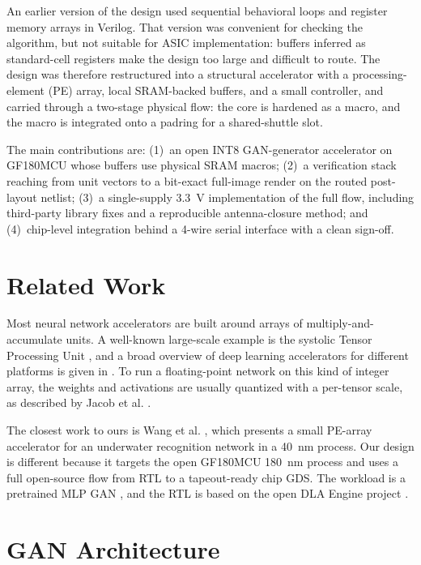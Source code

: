 \documentclass[conference,a4paper]{APSIPA2026}
\begin{document}
An earlier version of the design used sequential behavioral loops and register memory arrays in Verilog. That version was convenient for checking the algorithm, but not suitable for ASIC implementation: buffers inferred as standard-cell registers make the design too large and difficult to route. The design was therefore restructured into a structural accelerator with a processing-element (PE) array, local SRAM-backed buffers, and a small controller, and carried through a two-stage physical flow: the core is hardened as a macro, and the macro is integrated onto a padring for a shared-shuttle slot.

The main contributions are: (1)~an open INT8 GAN-generator accelerator on GF180MCU whose buffers use physical SRAM macros; (2)~a verification stack reaching from unit vectors to a bit-exact full-image render on the routed post-layout netlist; (3)~a single-supply 3.3~V implementation of the full flow, including third-party library fixes and a reproducible antenna-closure method; and (4)~chip-level integration behind a 4-wire serial interface with a clean sign-off.

\section{Related Work}
Most neural network accelerators are built around arrays of multiply-and-accumulate units. A well-known large-scale example is the systolic Tensor Processing Unit \cite{tpu}, and a broad overview of deep learning accelerators for different platforms is given in \cite{survey}. To run a floating-point network on this kind of integer array, the weights and activations are usually quantized with a per-tensor scale, as described by Jacob et al. \cite{jacob}.

The closest work to ours is Wang et al. \cite{wang}, which presents a small PE-array accelerator for an underwater recognition network in a 40~nm process. Our design is different because it targets the open GF180MCU 180~nm process and uses a full open-source flow from RTL to a tapeout-ready chip GDS. The workload is a pretrained MLP GAN \cite{goodfellow, ganpretrained}, and the RTL is based on the open DLA Engine project \cite{dlaengine}.

\section{GAN Architecture}\label{sec:overview}
\end{document}
